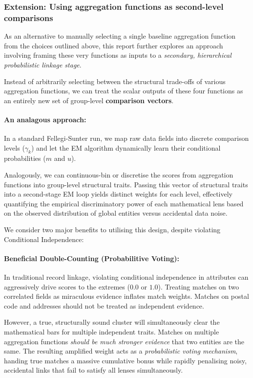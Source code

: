 \subsubsection{Extension: Using aggregation functions as second-level comparisons}
As an alternative to manually selecting a single baseline aggregation function from the choices outlined above, this report further explores an approach involving framing these very functions as inputs to a \textit{secondary, hierarchical probabilistic linkage stage}.

Instead of arbitrarily selecting between the structural trade-offs of various aggregation functions, we can treat the scalar outputs of these four functions as an entirely new set of group-level \textbf{comparison vectors}.

\paragraph{An analagous approach:}
In a standard Fellegi-Sunter run, we map raw data fields into discrete comparison levels ($\gamma_k$) and let the EM algorithm dynamically learn their conditional probabilities ($m$ and $u$).

Analogously, we can continuous-bin or discretise the scores from aggregation functions into group-level structural traits. Passing this vector of structural traits into a second-stage EM loop yields distinct weights for each level, effectively quantifying the empirical discriminatory power of each mathematical lens based on the observed distribution of global entities versus accidental data noise.


We consider two major benefits to utilising this design, despite violating Conditional Independence:

\paragraph{Beneficial Double-Counting (Probabilitive Voting):} In traditional record linkage, violating conditional independence in attributes can aggressively drive scores to the extremes ($0.0$ or $1.0$). Treating matches on two correlated fields as miraculous evidence inflates match weights. Matches on postal code and addresses should not be treated as independent evidence.

However, a true, structurally sound cluster will simultaneously clear the mathematical bars for multiple independent traits. Matches on multiple aggregation functions \textit{should be much stronger evidence} that two entities are the same. The resulting amplified weight acts as a \textit{probabilistic voting mechanism}, handing true matches a massive cumulative bonus while rapidly penalising noisy, accidental links that fail to satisfy all lenses simultaneously.

